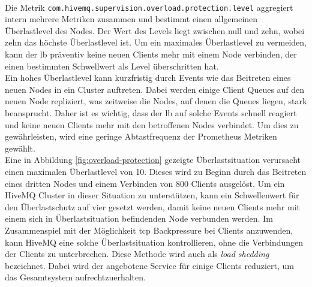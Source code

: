 \\
Die Metrik \verb|com.hivemq.supervision.overload.protection.level| aggregiert intern mehrere Metriken zusammen und bestimmt einen allgemeinen Überlastlevel des Nodes. Der Wert des Levels liegt zwischen null und zehn, wobei zehn das höchste Überlastlevel ist.
Um ein maximales Überlastlevel zu vermeiden, kann der \acl{lb} präventiv keine neuen Clients mehr mit einem Node verbinden, der einen bestimmten Schwellwert als Level überschritten hat.
\\
Ein hohes Überlastlevel kann kurzfristig durch Events wie das Beitreten eines neuen Nodes in ein Cluster auftreten. Dabei werden einige Client Queues auf den neuen Node repliziert, was zeitweise die Nodes, auf denen die Queues liegen, stark beansprucht. Daher ist es wichtig, dass der \ac{lb} auf solche Events schnell reagiert und keine neuen Clients mehr mit den betroffenen Nodes verbindet.
Um dies zu gewährleisten, wird eine geringe Abtastfrequenz der Prometheus Metriken gewählt.
\\
Eine in Abbildung \ref{fig:overload-protection} gezeigte Überlastsituation verursacht einen maximalen Überlastlevel von 10. Dieses wird zu Beginn durch das Beitreten eines dritten Nodes und einem Verbinden von 800 Clients ausgelöst.
Um ein HiveMQ Cluster in dieser Situation zu unterstützen, kann ein Schwellenwert für den Überlastschutz auf vier gesetzt werden, damit keine neuen Clients mehr mit einem sich in Überlastsituation befindenden Node verbunden werden.
Im Zusammenspiel mit der Möglichkeit \ac{tcp} Backpressure bei Clients anzuwenden, kann HiveMQ eine solche Überlastsituation kontrollieren, ohne die Verbindungen der Clients zu unterbrechen.
Diese Methode wird auch als \textit{load shedding} bezeichnet. Dabei wird der angebotene Service für einige Clients reduziert, um das Gesamtsystem aufrechtzuerhalten.
\\
